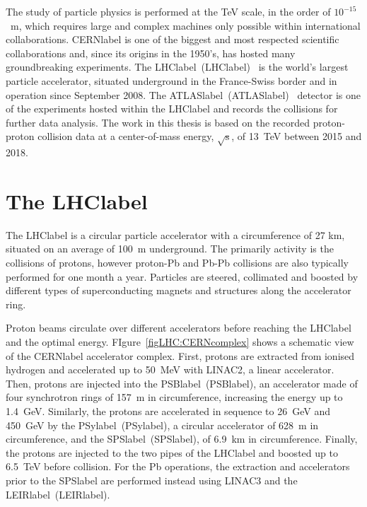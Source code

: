 The study of particle physics is performed at the TeV scale, in the order of $10^{-15}$~m, which requires large and complex machines only possible within international collaborations. \acrshort{CERNlabel} is one of the biggest and most respected scientific collaborations and, since its origins in the 1950's, has hosted many groundbreaking experiments. The \acrlong{LHClabel}~(\acrshort{LHClabel})~\cite{LHCmachine} is the world's largest particle accelerator, situated underground in the France-Swiss border and in operation since September 2008. The \acrlong{ATLASlabel}~(\acrshort{ATLASlabel})~\cite{ATLASmachine} detector is one of the experiments hosted within the \acrshort{LHClabel} and records the collisions for further data analysis. The work in this thesis is based on the recorded proton-proton collision data at a center-of-mass energy, $\sqrt{\text{s}}$, of 13~TeV between 2015 and 2018.
\section{The \acrshort{LHClabel}}

The \acrshort{LHClabel} is a circular particle accelerator with a circumference of 27 km, situated on an average of 100~m underground. The primarily activity is the collisions of protons, however proton-Pb and Pb-Pb collisions are also typically performed for one month a year. Particles are steered, collimated and boosted by different types of superconducting magnets and structures along the accelerator ring.

Proton beams circulate over different accelerators before reaching the \acrshort{LHClabel} and the optimal energy. FIgure~\ref{figLHC:CERNcomplex} shows a schematic view of the \acrshort{CERNlabel} accelerator complex. First, protons are extracted from ionised hydrogen and accelerated up to 50~MeV with LINAC2, a linear accelerator. Then, protons are injected into the \acrlong{PSBlabel}~(\acrshort{PSBlabel}), an accelerator made of four synchrotron rings of 157~m in circumference, increasing the energy up to 1.4~GeV. Similarly, the protons are accelerated in sequence to 26~GeV and 450~GeV by the \acrlong{PSylabel}~(\acrshort{PSylabel}), a circular accelerator of 628~m in circumference, and the \acrlong{SPSlabel}~(\acrshort{SPSlabel}), of 6.9~km in circumference. Finally, the protons are injected to the two pipes of the \acrshort{LHClabel} and boosted up to 6.5~TeV before collision. For the Pb operations, the extraction and accelerators prior to the \acrshort{SPSlabel} are performed instead using LINAC3 and the \acrlong{LEIRlabel}~(\acrshort{LEIRlabel}).

